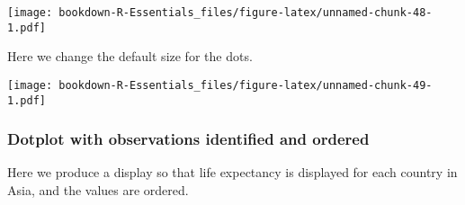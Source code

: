 \documentclass[
]{book}
\newenvironment{Shaded}{\begin{snugshade}}{\end{snugshade}}
\newcommand{\CommentTok}[1]{\textcolor[rgb]{0.56,0.35,0.01}{\textit{#1}}}
\newcommand{\DataTypeTok}[1]{\textcolor[rgb]{0.13,0.29,0.53}{#1}}
\newcommand{\DecValTok}[1]{\textcolor[rgb]{0.00,0.00,0.81}{#1}}
\newcommand{\FloatTok}[1]{\textcolor[rgb]{0.00,0.00,0.81}{#1}}
\newcommand{\KeywordTok}[1]{\textcolor[rgb]{0.13,0.29,0.53}{\textbf{#1}}}
\newcommand{\NormalTok}[1]{#1}
\newcommand{\OperatorTok}[1]{\textcolor[rgb]{0.81,0.36,0.00}{\textbf{#1}}}
\newcommand{\StringTok}[1]{\textcolor[rgb]{0.31,0.60,0.02}{#1}}
\begin{document}
\texttt{[image: bookdown-R-Essentials\_files/figure-latex/unnamed-chunk-48-1.pdf]}

Here we change the default size for the dots.

\begin{Shaded}
\end{Shaded}

\texttt{[image: bookdown-R-Essentials\_files/figure-latex/unnamed-chunk-49-1.pdf]}

\hypertarget{dotplot-with-observations-identified-and-ordered}{%
\subsubsection{Dotplot with observations identified and ordered}\label{dotplot-with-observations-identified-and-ordered}}

Here we produce a display so that life expectancy is displayed for each country in Asia, and the values are ordered.

\begin{Shaded}
\end{Shaded}
\end{document}
